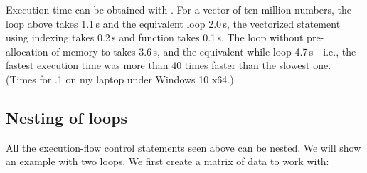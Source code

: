 \documentclass[krantz2]{krantz}\usepackage{knitr}
\begin{document}
\begin{explainbox}
\begin{knitrout}\footnotesize
{}\color{fgcolor}\begin{kframe}
\begin{alltt}
 \hlkwb{<-} \hlstd{a[}\hlopt{:}\hlstd{(a)]} \hlopt{-} \hlstd{a[}\hlopt{:}\hlopt{-}\hlstd{]}
\end{alltt}
\end{kframe}
\end{knitrout}

\begin{knitrout}\footnotesize
{}\color{fgcolor}\begin{kframe}
\begin{alltt}
 \hlkwb{<-} 
\end{alltt}
\end{kframe}
\end{knitrout}

Execution time can be obtained with . For a vector of ten million numbers, the  loop above takes 1.1\,s and the equivalent  loop 2.0\,s, the vectorized statement using indexing takes 0.2\,s and function  takes 0.1\,s. The  loop without pre-allocation of memory to  takes 3.6\,s, and the equivalent while loop 4.7\,s---i.e., the fastest execution time was more than 40 times faster than the slowest one. (Times for .1 on my laptop under Windows 10 x64.)
\end{explainbox}

\subsection{Nesting of loops}\label{sec:nested:loops}

All the execution-flow control statements seen above can be nested. We will show an example with two  loops. We first create a matrix of data to work with:
\end{document}
